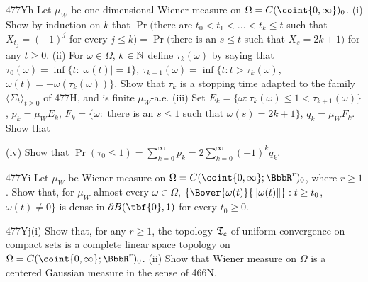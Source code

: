 {\spheader 477Yh Let $\mu_W$ be one-dimensional Wiener measure
on $\Omega=C(\coint{0,\infty})_0$.   (i) Show
by induction on $k$ that $\Pr($there are $t_0<t_1<\ldots<t_k\le t$ such
that $X_{t_j}=(-1)^j$ for every $j\le k)
=\Pr($there is an $s\le t$ such that
$X_s=2k+1)$ for any $t\ge 0$.     (ii) For $\omega\in\Omega$,
$k\in\Bbb N$ define $\tau_k(\omega)$ by saying that
$\tau_0(\omega)=\inf\{t:|\omega(t)|=1\}$,
$\tau_{k+1}(\omega)=\inf\{t:t>\tau_k(\omega)$,
$\omega(t)=-\omega(\tau_k(\omega))\}$.   Show that $\tau_k$ is a stopping
time adapted to the family $\langle\Sigma_t\rangle_{t\ge 0}$ of 477H,
and is finite $\mu_W$-a.e.   (iii) Set
$E_k=\{\omega:\tau_k(\omega)\le 1<\tau_{k+1}(\omega)\}$,
$p_k=\mu_WE_k$, $F_k=\{\omega:$ there is an $s\le 1$ such that
$\omega(s)=2k+1\}$, $q_k=\mu_WF_k$.   Show that


\noindent (iv) Show that
$\Pr(\tau_0\le 1)=\sum_{k=0}^{\infty}p_k=2\sum_{k=0}^{\infty}(-1)^kq_k$.

\spheader 477Yi Let $\mu_W$ be Wiener measure on
$\Omega=C(\coint{0,\infty};\BbbR^r)_0$, where $r\ge 1$.
Show that, for $\mu_W$-almost every $\omega\in\Omega$,
$\{\Bover{\omega(t)}{\|\omega(t)\|}:t\ge t_0$, $\omega(t)\ne 0\}$
is dense in $\partial B(\tbf{0},1)$ for every $t_0\ge 0$.

\spheader 477Yj(i) Show that, for any $r\ge 1$,
the topology $\frak T_c$ of uniform
convergence on compact sets is a complete linear space topology on
$\Omega=C(\coint{0,\infty};\BbbR^r)_0$.   (ii) Show that Wiener measure on
$\Omega$ is a centered Gaussian measure in the sense of 466N.
}%

